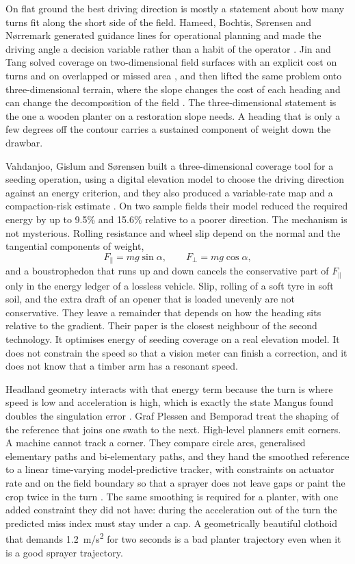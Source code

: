 On flat ground the best driving direction is mostly a statement about how many turns fit along the short side of the field. Hameed, Bochtis, S{\o}rensen and N{\o}rremark generated guidance lines for operational planning and made the driving angle a decision variable rather than a habit of the operator \cite{hameed2010}. Jin and Tang solved coverage on two-dimensional field surfaces with an explicit cost on turns and on overlapped or missed area \cite{jin2010}, and then lifted the same problem onto three-dimensional terrain, where the slope changes the cost of each heading and can change the decomposition of the field \cite{jin2011}. The three-dimensional statement is the one a wooden planter on a restoration slope needs. A heading that is only a few degrees off the contour carries a sustained component of weight down the drawbar.

Vahdanjoo, Gislum and S{\o}rensen built a three-dimensional coverage tool for a seeding operation, using a digital elevation model to choose the driving direction against an energy criterion, and they also produced a variable-rate map and a compaction-risk estimate \cite{vahdanjoo2023}. On two sample fields their model reduced the required energy by up to \num{9.5}\% and \num{15.6}\% relative to a poorer direction. The mechanism is not mysterious. Rolling resistance and wheel slip depend on the normal and the tangential components of weight,
\begin{equation}
\label{eq:grade}
F_{\parallel} = mg\sin\alpha,\qquad F_{\perp} = mg\cos\alpha,
\end{equation}
and a boustrophedon that runs up and down cancels the conservative part of \(F_{\parallel}\) only in the energy ledger of a lossless vehicle. Slip, rolling of a soft tyre in soft soil, and the extra draft of an opener that is loaded unevenly are not conservative. They leave a remainder that depends on how the heading sits relative to the gradient. Their paper is the closest neighbour of the second technology. It optimises energy of seeding coverage on a real elevation model. It does not constrain the speed so that a vision meter can finish a correction, and it does not know that a timber arm has a resonant speed.

Headland geometry interacts with that energy term because the turn is where speed is low and acceleration is high, which is exactly the state Mangus found doubles the singulation error \cite{mangus2017}. Graf Plessen and Bemporad treat the shaping of the reference that joins one swath to the next. High-level planners emit corners. A machine cannot track a corner. They compare circle arcs, generalised elementary paths and bi-elementary paths, and they hand the smoothed reference to a linear time-varying model-predictive tracker, with constraints on actuator rate and on the field boundary so that a sprayer does not leave gaps or paint the crop twice in the turn \cite{plessen2017}. The same smoothing is required for a planter, with one added constraint they did not have: during the acceleration out of the turn the predicted miss index must stay under a cap. A geometrically beautiful clothoid that demands \SI{1.2}{m/s^2} for two seconds is a bad planter trajectory even when it is a good sprayer trajectory.

